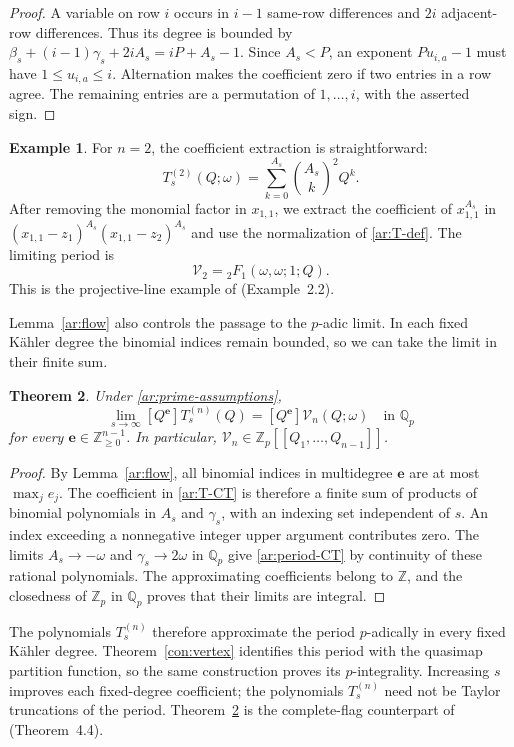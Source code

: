 \documentclass[11pt]{amsart}
\newtheorem{theorem}{Theorem}[section]
\theoremstyle{definition}
\newtheorem{example}[theorem]{Example}
\theoremstyle{remark}
\numberwithin{equation}{section}
\newcommand{\Z}{\mathbb Z}
\newcommand{\Q}{\mathbb Q}
\begin{document}
\begin{proof}
A variable on row $i$ occurs in $i-1$ same-row differences and
$2i$ adjacent-row differences. Thus its degree is bounded by
$\beta_s+(i-1)\gamma_s+2iA_s=iP+A_s-1$.
Since $A_s<P$, an exponent $Pu_{i,a}-1$ must have
$1\leq u_{i,a}\leq i$. Alternation makes the coefficient zero
if two entries in a row agree. The remaining entries are a
permutation of $1,\ldots,i$, with the asserted sign.
\end{proof}

\begin{example}\label{ar:rank-one}
For $n=2$, the coefficient extraction is straightforward:
\[
 T_s^{(2)}(Q;\omega)=\sum_{k=0}^{A_s}\binom{A_s}{k}^{\!2}Q^k.
\]
After removing the monomial factor in $x_{1,1}$, we extract the
coefficient of $x_{1,1}^{A_s}$ in
$(x_{1,1}-z_1)^{A_s}(x_{1,1}-z_2)^{A_s}$ and use the normalization
of \eqref{ar:T-def}. The limiting period is
\[
 \mathcal V_2={}_2F_1(\omega,\omega;1;Q).
\]
This is the projective-line example of \cite{SV23}
(Example~2.2).
\end{example}

Lemma~\ref{ar:flow} also controls the passage to the $p$-adic
limit. In each fixed K\"ahler degree the binomial indices remain
bounded, so we can take the limit in their finite sum.

\begin{theorem}\label{ar:limit}
Under \eqref{ar:prime-assumptions},
\[
 \lim_{s\to\infty}[Q^{\boldsymbol e}]T_s^{(n)}(Q)
 =[Q^{\boldsymbol e}]\mathcal V_n(Q;\omega)
 \quad\text{in }\Q_p
\]
for every $\boldsymbol e\in\Z_{\geq0}^{n-1}$. In particular,
$\mathcal V_n\in\Z_p[[Q_1,\ldots,Q_{n-1}]]$.
\end{theorem}

\begin{proof}
By Lemma~\ref{ar:flow}, all binomial indices in multidegree
$\boldsymbol e$ are at most $\max_j e_j$. The coefficient in
\eqref{ar:T-CT} is therefore a finite sum of products of binomial
polynomials in $A_s$ and $\gamma_s$, with an indexing set
independent of $s$. An index exceeding a nonnegative integer
upper argument contributes zero. The limits $A_s\to-\omega$
and $\gamma_s\to2\omega$ in $\Q_p$ give \eqref{ar:period-CT} by
continuity of these rational polynomials. The approximating
coefficients belong to $\Z$, and the closedness of $\Z_p$ in
$\Q_p$ proves that their limits are integral.
\end{proof}

The polynomials $T_s^{(n)}$ therefore approximate the period
$p$-adically in every fixed K\"ahler degree.
Theorem~\ref{con:vertex} identifies this period
with the quasimap partition function, so the same construction
proves its $p$-integrality. Increasing $s$ improves each fixed-degree
coefficient; the polynomials $T_s^{(n)}$ need not be Taylor
truncations of the period. Theorem~\ref{ar:limit} is the
complete-flag counterpart of \cite{SV23} (Theorem~4.4).
\end{document}
